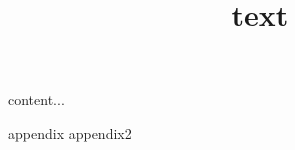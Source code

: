 \documentclass{beamer}
\title{text}
\begin{document}
\begin{frame}
\titlepage
\end{frame}

\begin{frame}
content...
\end{frame}

\appendix

\begin{frame}[label=foo]
appendix
\pause
appendix2
\end{frame}
\end{document}
